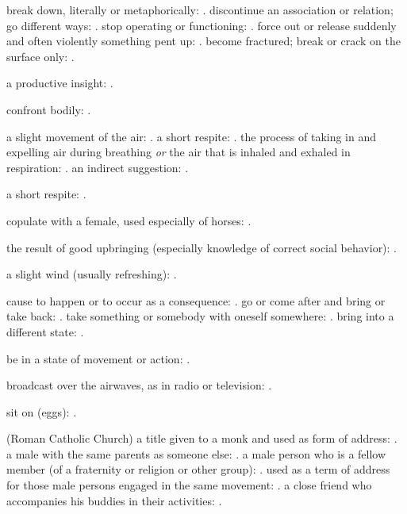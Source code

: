   break down, literally or metaphorically: . discontinue an association or relation; go different ways: . stop operating or functioning: . force out or release suddenly and often violently something pent up: . become fractured; break or crack on the surface only: .

  a productive insight: .

  confront bodily: .

  a slight movement of the air: . a short respite: . the process of taking in and expelling air during breathing \textit{or} the air that is inhaled and exhaled in respiration: . an indirect suggestion: .

  a short respite: .

  copulate with a female, used especially of horses: .

  the result of good upbringing (especially knowledge of correct social behavior): .

  a slight wind (usually refreshing): .

  cause to happen or to occur as a consequence: . go or come after and bring or take back: . take something or somebody with oneself somewhere: . bring into a different state: .

  be in a state of movement or action: .

  broadcast over the airwaves, as in radio or television: .

  sit on (eggs): .

  (Roman Catholic Church) a title given to a monk and used as form of address: . a male with the same parents as someone else: . a male person who is a fellow member (of a fraternity or religion or other group): . used as a term of address for those male persons engaged in the same movement: . a close friend who accompanies his buddies in their activities: .

